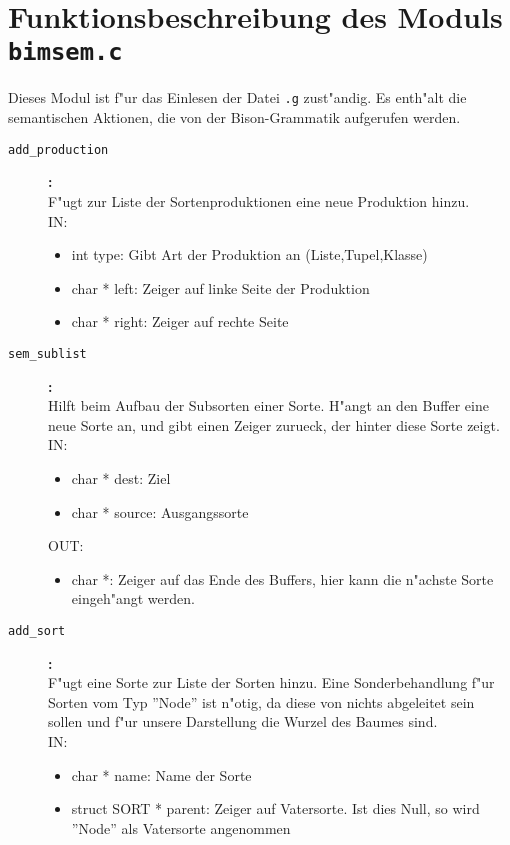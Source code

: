 \section{Funktionsbeschreibung des Moduls {\tt bimsem.c}}

Dieses Modul ist f"ur das Einlesen der Datei {\tt .g} zust"andig.
Es enth"alt die semantischen Aktionen, die von der Bison-Grammatik
aufgerufen werden.

\begin{description}
\item[\tt add\_production
]{\bf :\\}
F"ugt zur Liste der Sortenproduktionen eine neue
 Produktion hinzu.
 \\
IN:
\begin{itemize}
   \item int type: Gibt Art der Produktion an (Liste,Tupel,Klasse)
\item char * left: Zeiger auf linke Seite der Produktion
\item char * right: Zeiger auf rechte Seite

\end{itemize}
\item[\tt sem\_sublist
]{\bf :\\}
Hilft beim Aufbau der Subsorten einer Sorte.
 H"angt an den Buffer eine neue Sorte an, und gibt einen
 Zeiger zurueck, der hinter diese Sorte zeigt.
 \\
IN:
\begin{itemize}
   \item char * dest: Ziel
\item char * source: Ausgangssorte

\end{itemize}
OUT:
\begin{itemize}
   \item char *: Zeiger auf das Ende des Buffers, hier kann die
n"achste Sorte eingeh"angt werden.

\end{itemize}

\item[\tt add\_sort
]{\bf :\\}
F"ugt eine Sorte zur Liste der Sorten hinzu.
 Eine Sonderbehandlung f"ur Sorten vom Typ ''Node'' ist n"otig,
 da diese von nichts abgeleitet sein sollen und f"ur unsere
 Darstellung die Wurzel des Baumes sind.
 \\
IN:
\begin{itemize}
   \item char * name: Name der Sorte
\item struct SORT * parent: Zeiger auf Vatersorte. Ist dies
Null, so wird ''Node'' als Vatersorte angenommen


\end{itemize}
\end{description}
